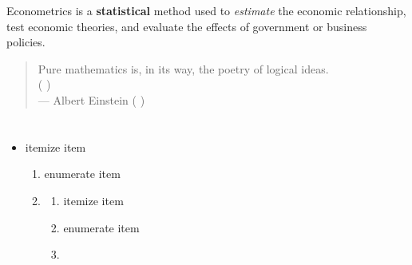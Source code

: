 \documentclass{article}
\begin{document}
\linespread{1}  %
\begin{frame}{\textbf{ }}
\linespread{1.5} %

	 
	 
	 
	 
	
	 \bigskip 
	 
	\pause 
	
	 \alert{Econometrics} is a \textbf{statistical} method used to \textit{estimate} the economic relationship,
	 test economic theories, and evaluate the effects of government or business policies.
	 
	 \pause
	
	\bigskip 

	\begin{quote}
		Pure mathematics is, in its way, the poetry of logical ideas.\\
		( )\\
		--- Albert Einstein ( )
	\end{quote}
	
\end{frame}

%	 

\section{ }


\linespread{1}  %
\begin{frame}[<+>]{\textbf{ }}
\linespread{1.5} %

	\begin{itemize}[] %
		\item   itemize   item
		\begin{enumerate}[] %
			\item   enumerate   item
			\item  
				\begin{enumerate}[1] %
					\item   itemize   item  
					\item   enumerate   item  
					\item  
				\end{enumerate}
		\end{enumerate}
	\end{itemize}
	
\end{frame}
\end{document}
